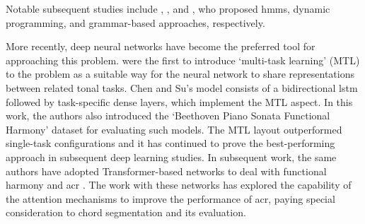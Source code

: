 


Notable subsequent studies include
\textcite{raphael2004functional},
\textcite{illescas2007harmonic}, and
\textcite{magalhaes2011functional}, who proposed
\glspl{hmm}, dynamic programming, and grammar-based
approaches, respectively.

More recently, deep neural networks have become the
preferred tool for approaching this problem.
\textcite{chen2018functional} were the first to introduce
`multi-task learning' (MTL) \parencite{ruder2017overview} to
the problem as a suitable way for the neural network to
share representations between related tonal tasks. Chen and
Su's model consists of a bidirectional \gls{lstm}
\parencite{hochreiter1997long} followed by task-specific
dense layers, which implement the MTL aspect. In this work,
the authors also introduced the `Beethoven Piano Sonata
Functional Harmony' dataset for evaluating such models. The
MTL layout outperformed single-task configurations and it
has continued to prove the best-performing approach in
subsequent deep learning studies. In subsequent work, the
same authors have adopted Transformer-based networks to deal
with functional harmony and \gls{acr}
\parencite{chen2019harmony, chen2021attend}. The work with
these networks has explored the capability of the attention
mechanisms to improve the performance of \gls{acr}, paying
special consideration to chord segmentation and its
evaluation.

